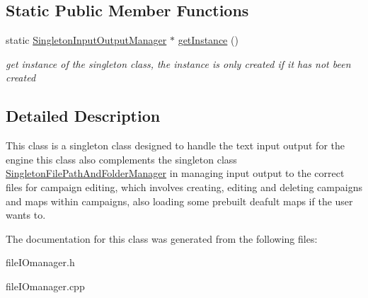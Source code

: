 \subsection*{Static Public Member Functions}
\begin{DoxyCompactItemize}
\item 
\hypertarget{class_singleton_input_output_manager_ab2dbe239756970b1962fde9aec9b4b14}{}\label{class_singleton_input_output_manager_ab2dbe239756970b1962fde9aec9b4b14} 
static \hyperlink{class_singleton_input_output_manager}{Singleton\+Input\+Output\+Manager} $\ast$ \hyperlink{class_singleton_input_output_manager_ab2dbe239756970b1962fde9aec9b4b14}{get\+Instance} ()
\begin{DoxyCompactList}\small\item\em get instance of the singleton class, the instance is only created if it has not been created \end{DoxyCompactList}\end{DoxyCompactItemize}


\subsection{Detailed Description}
This class is a singleton class designed to handle the text input output for the engine this class also complements the singleton class \hyperlink{class_singleton_file_path_and_folder_manager}{Singleton\+File\+Path\+And\+Folder\+Manager} in managing input output to the correct files for campaign editing, which involves creating, editing and deleting campaigns and maps within campaigns, also loading some prebuilt deafult maps if the user wants to. 

The documentation for this class was generated from the following files\+:\begin{DoxyCompactItemize}
\item 
file\+I\+Omanager.\+h\item 
file\+I\+Omanager.\+cpp\end{DoxyCompactItemize}
